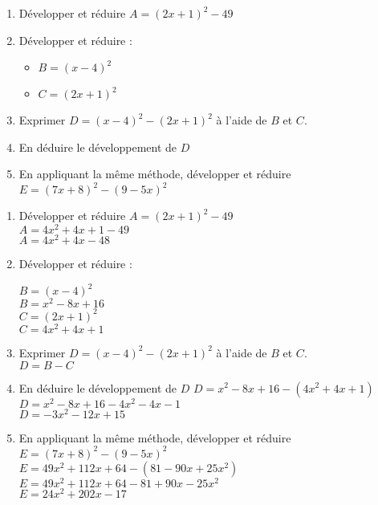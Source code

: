 \begin{exercice*}
    \begin{enumerate}
        \item Développer et réduire $A=(2x+1)^2-49$
        \item Développer et réduire :
        \begin{itemize}
            \item[] $B = (x-4)^2$
            \item[] $C = (2x+1)^2$
        \end{itemize}
        \item Exprimer $D = (x-4)^2 - (2x+1)^2$ à l'aide de $B$ et $C$.
        \item En déduire le développement de $D$
        \item En appliquant la même méthode, développer et réduire $E=(7x+8)^2-(9-5x)^2$
    \end{enumerate}
\end{exercice*}
\begin{corrige}
    \begin{enumerate}
        \item Développer et réduire $A=(2x+1)^2-49$\\
        {\red $A=4x^2+4x+1-49$\\$A=4x^2+4x-48$}
        \item Développer et réduire :\\
        \begin{itemize}
            \def\item{}
            \item $B = (x-4)^2$\\
            {\red $B=x^2-8x+16$\\}
            \item $C = (2x+1)^2$\\
            {\red $C=4x^2+4x+1$}
        \end{itemize}
        \item Exprimer $D = (x-4)^2 - (2x+1)^2$ à l'aide de $B$ et $C$.\\
        {\red $D = B-C$}
        \item En déduire le développement de $D$
        {\red $D=x^2-8x+16 - (4x^2+4x+1)$\\$D=x^2-8x+16-4x^2-4x-1$\\$D=-3x^2-12x+15$}
    \end{enumerate}
    \Coupe
    \begin{enumerate}
    \setcounter{enumi}{4}
        \item En appliquant la même méthode, développer et réduire $E=(7x+8)^2-(9-5x)^2$\\
        {\red $E=49x^2+112x+64-(81-90x+25x^2)$\\$E=49x^2+112x+64-81+90x-25x^2$\\$E=24x^2+202x-17$}
    \end{enumerate}
\end{corrige}


